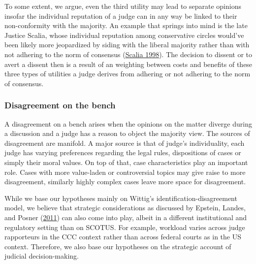 \documentclass[
  11pt,
]{article}
\begin{document}
To some extent, we argue, even the third utility may lead to separate
opinions insofar the individual reputation of a judge can in any way be
linked to their non-conformity with the majority. An example that
springs into mind is the late Justice Scalia, whose individual
reputation among conservative circles would've been likely more
jeopardized by siding with the liberal majority rather than with not
adhering to the norm of consensus
(\protect\hyperlink{ref-scaliaDissents1998}{Scalia 1998}). The decision
to dissent or to avert a dissent then is a result of an weighting
between costs and benefits of these three types of utilities a judge
derives from adhering or not adhering to the norm of consensus.

\hypertarget{disagreement-on-the-bench}{%
\subsubsection{Disagreement on the
bench}\label{disagreement-on-the-bench}}

A disagreement on a bench arises when the opinions on the matter diverge
during a discussion and a judge has a reason to object the majority
view. The sources of disagreement are manifold. A major source is that
of judge's individuality, each judge has varying preferences regarding
the legal rules, dispositions of cases or simply their moral values. On
top of that, case characteristics play an important role. Cases with
more value-laden or controversial topics may give raise to more
disagreement, similarly highly complex cases leave more space for
disagreement.

While we base our hypotheses mainly on Wittig's
identification-disagreement model, we believe that strategic
considerations as discussed by Epstein, Landes, and Posner
(\protect\hyperlink{ref-epsteinWhyWhenJudges2011}{2011}) can also come
into play, albeit in a different institutional and regulatory setting
than on SCOTUS. For example, workload varies across judge rapporteurs in
the CCC context rather than across federal courts as in the US context.
Therefore, we also base our hypotheses on the strategic account of
judicial decision-making.
\end{document}
